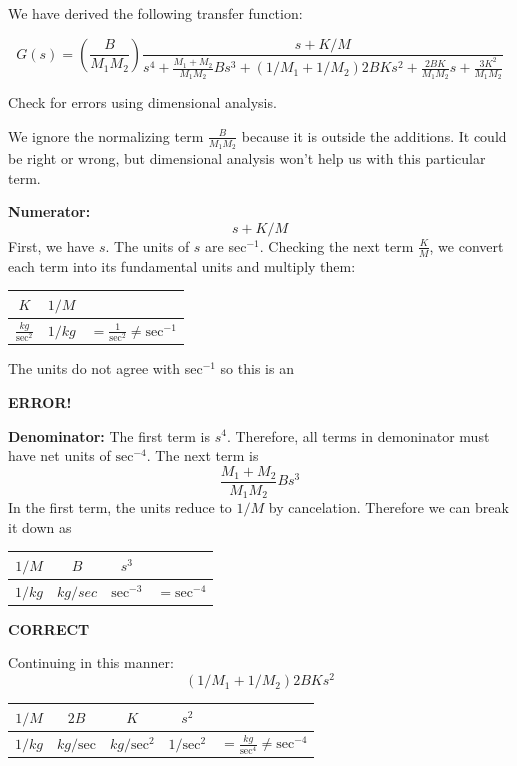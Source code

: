 \begin{ExampleSmall}

We have derived the following transfer function:

\[
G(s) = \left( \frac {B} {M_1M_2}\right) \frac{s+K/M}
 {s^4 + \frac{M_1+M_2}{M_1M_2}Bs^3+(1/M_1+1/M_2)2BKs^2+\frac{2BK}{M_1M_2}s+\frac{3K^2}{M_1M_2}}
\]

Check for errors using dimensional analysis.

\vspace{0.25in}

We  ignore the normalizing term $\frac{B}{M_1M_2}$ because it is outside the additions.  It could be right or wrong, but 
dimensional analysis won't help us with this particular term. 


{\bf Numerator:}
\[
s+K/M
\]
First, we have $s$.  The units of $s$ are sec$^{-1}$.  Checking the next term $\frac{K}{M}$, we convert each term into its fundamental units and multiply them:

\begin{tabular}{c|c|c}
$K$ 	&	$1/M$  &	\\ \hline
$\frac{kg}{\mathrm{sec}^2}$ & $1/kg$ & $= \frac{1}{\mathrm{sec}^2} \neq \mathrm{sec}^{-1}$ \\
\end{tabular}

The units do not agree with sec$^{-1}$ so this is an
\vspace{0.075in}

{\bf ERROR!}

\vspace{0.2in}

{\bf Denominator: } The first term is $s^4$.  Therefore, all terms in demoninator must have net units of $\mathrm{sec}^{-4}$.  The next term is
\[
\frac{M_1+M_2}{M_1M_2}Bs^3
\]
In the first term, the units reduce to $1/M$ by cancelation.   Therefore we can break it down as

\begin{tabular}{c|c|c|c}
$1/M$	& $B$      & $s^3$ & \\ \hline
$1/kg$  & $kg/sec$ & $\mathrm{sec}^{-3}$ & $= \mathrm{sec}^{-4}$
\end{tabular}

\vspace{0.075in}
{\bf CORRECT}

Continuing in this manner:
\[
(1/M_1+1/M_2)2BKs^2
\]

\begin{tabular}{c|c|c|c|c}
$1/M$	& $2B$	& $K$	& $s^2$ & \\ \hline
$1/kg$  & $kg/\mathrm{sec}$	& $kg/\mathrm{sec}^2$	& $1/\mathrm{sec}^2$	& $= \frac{kg}{\mathrm{sec}^4} \neq \mathrm{sec}^{-4}$
\end{tabular}


\end{ExampleSmall}
